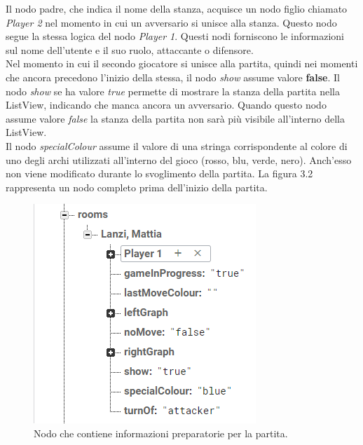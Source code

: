 \documentclass[a4paper,12pt,twoside,openright]{report}
\begin{document}
Il nodo padre, che indica il nome della stanza, acquisce un nodo figlio chiamato \textit{Player 2} nel momento in cui un avversario si unisce alla stanza. Questo nodo segue la stessa logica del nodo \textit{Player 1}. Questi nodi forniscono le informazioni sul nome dell'utente e il suo ruolo, attaccante o difensore.\\
Nel momento in cui il secondo giocatore si unisce alla partita, quindi nei momenti che ancora precedono l'inizio della stessa, il nodo \textit{show} assume valore \textbf{false}.
Il nodo \textit{show} se ha valore \textit{true} permette di mostrare la stanza della partita nella ListView, indicando che manca ancora un avversario. Quando questo nodo assume valore \textit{false} la stanza della partita non sarà più visibile all'interno della ListView.\\
Il nodo \textit{specialColour} assume il valore di una stringa corrispondente al colore di uno degli archi utilizzati all'interno del gioco (rosso, blu, verde, nero). Anch'esso non viene modificato durante lo svoglimento della partita. La figura 3.2 rappresenta un nodo completo prima dell'inizio della partita.\\
\begin{figure}[h]
\includegraphics{images/Match pre node.png}
\caption{Nodo che contiene informazioni preparatorie per la partita.}
\end{figure}
\end{document}
